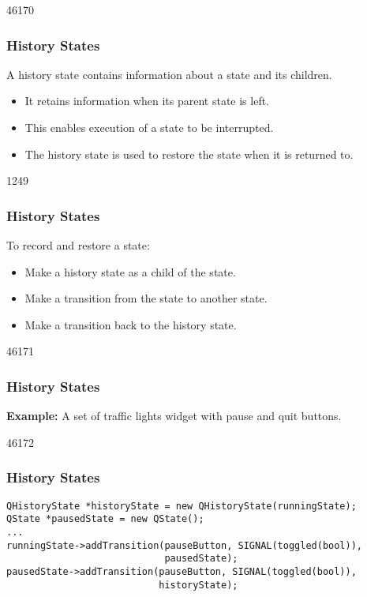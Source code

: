 \begin{slide}{46170}\frametitle{History States}
\vfill
A history state contains information about a state and its children.

\begin{itemize}
\item It retains information when its parent state is left.
\item This enables execution of a state to be interrupted.
\item The history state is used to restore the state when it is returned to.
\end{itemize}
\end{slide}

\begin{slide}{1249}\frametitle{History States}
\vfill
To record and restore a state:

\begin{itemize}
\item Make a history state as a child of the state.
\item Make a transition from the state to another state.
\item Make a transition back to the history state.
\end{itemize}
\end{slide}

\begin{slide}{46171}\frametitle{History States}
\textbf{Example:} A set of traffic lights widget with pause and quit buttons.

\vspace*{0.5em}
\vfill
\end{slide}

\begin{slide}[fragile]{46172}\frametitle{History States}
\vspace*{-0.5em}
\vspace*{-1.0em}
\small
\begin{lstlisting}
QHistoryState *historyState = new QHistoryState(runningState);
QState *pausedState = new QState();
...
runningState->addTransition(pauseButton, SIGNAL(toggled(bool)),
                            pausedState);
pausedState->addTransition(pauseButton, SIGNAL(toggled(bool)),
                           historyState);
\end{lstlisting}
\normalsize
\vfill
{}
\end{slide}

